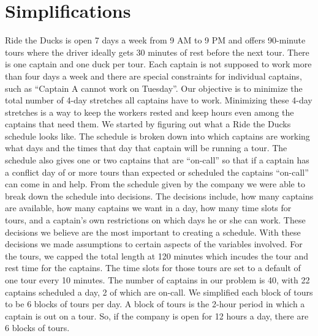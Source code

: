 \documentclass[12pt]{article}
\begin{document}
\section*{Simplifications}
Ride the Ducks is open 7 days a week from 9 AM to 9 PM and offers 90-minute tours 
where the driver ideally gets 30 minutes of rest before the next tour. There is one captain 
and one duck per tour. Each captain is not supposed to work more than four days a week 
and there are special constraints for individual captains, such as “Captain A cannot work 
on Tuesday”. Our objective is to minimize the total number of 4-day stretches all captains 
have to work. Minimizing these 4-day stretches is a way to keep the workers rested and 
keep hours even among the captains that need them.  We started by figuring out what a 
Ride the Ducks schedule looks like. The schedule is broken down into which captains are
working what days and the times that day that captain will be running a tour. The 
schedule also gives one or two captains that are “on-call” so that if a captain has a 
conflict day of or more tours than expected or scheduled the captains “on-call” can come 
in and help. From the schedule given by the company we were able to break down the 
schedule into decisions. The decisions include, how many captains are available, how 
many captains we want in a day, how many time slots for tours, and a captain’s own 
restrictions on which days he or she can work. These decisions we believe are the most 
important to creating a schedule. With these decisions we made assumptions to certain 
aspects of the variables involved. For the tours, we capped the total length at 120 minutes 
which incudes the tour and rest time for the captains. The time slots for those tours are set 
to a default of one tour every 10 minutes. The number of captains in our problem is 40, 
with 22 captains scheduled a day, 2 of which are on-call. We simplified each block of 
tours to be 6 blocks of tours per day. A block of tours is the 2-hour period in which a 
captain is out on a tour. So, if the company is open for 12 hours a day, there are 6 blocks 
of tours.
\end{document}
